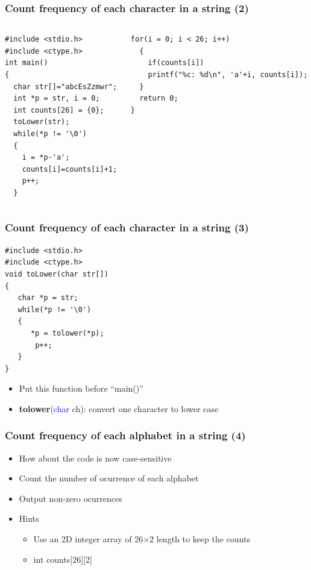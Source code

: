\ifx\answers\undefined
\begin{frame}[fragile]
\frametitle{Count frequency of each character in a string (2)}
\vspace{-0.25in}
\begin{columns}
\begin{column}{0.46\linewidth}
\begin{lstlisting}[xleftmargin=0.05\linewidth]
#include <stdio.h>
#include <ctype.h>
int main()
{
  char str[]="abcEsZzmwr";
  int *p = str, i = 0;
  int counts[26] = {0};
  toLower(str);
  while(*p != '\0')
  {
    i = *p-'a';
    counts[i]=counts[i]+1;
    p++;
  }

\end{lstlisting}
\end{column}
\begin{column}{0.54\linewidth}
\begin{lstlisting}[xleftmargin=0.05\linewidth]
  for(i = 0; i < 26; i++)
  {
    if(counts[i])
    printf("%c: %d\n", 'a'+i, counts[i]);
  }
  return 0;
}
\end{lstlisting}
\end{column}
\end{columns}
\end{frame}
\fi

\ifx\answers\undefined
\begin{frame}[fragile]
\frametitle{Count frequency of each character in a string (3)}
\begin{lstlisting}[xleftmargin=0.1\linewidth, linewidth=0.8\linewidth]
#include <stdio.h>
#include <ctype.h>
void toLower(char str[])
{
   char *p = str;
   while(*p != '\0')
   {
	  *p = tolower(*p);
	   p++;
   }
}
\end{lstlisting}
\begin{itemize}
	\item {Put this function before ``main()''}
	\item {\textbf{tolower}(\textcolor{blue}{char} ch): convert one character to lower case}
\end{itemize}
\end{frame}
\fi

\begin{frame}
\frametitle{Count frequency of each alphabet in a string (4)}

\begin{itemize}
	\item {How about the code is now case-sensitive}
	\item {Count the number of ocurrence of each alphabet}
	\item {Output non-zero ocurrences}
	\item {Hints}
	\begin{itemize}
		\item {Use an 2D integer array of 26{$\times$}2 length to keep the counts}
		\item {int counts[26][2]}
	\end{itemize}
\end{itemize}
\end{frame}


